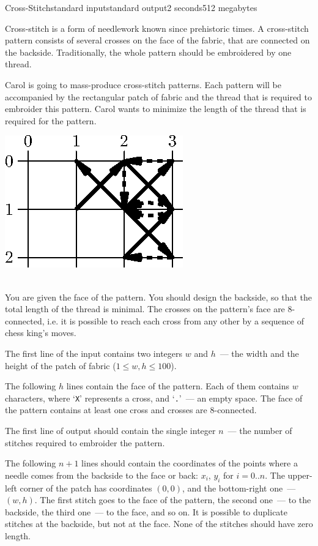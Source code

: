 \begin{problem}{Cross-Stitch}{standard input}{standard output}{2 seconds}{512 megabytes}

Cross-stitch is a form of needlework known since prehistoric times. A cross-stitch pattern consists of several crosses on the face of the fabric, that are connected on the backside. Traditionally, the whole pattern should be embroidered by one thread.

Carol is going to mass-produce cross-stitch patterns. Each pattern will be accompanied by the rectangular patch of fabric and the thread that is required to embroider this pattern. Carol wants to minimize the length of the thread that is required for the pattern.\\
\centerline{\includegraphics{cross-stitch-1.ps}}\\
You are given the face of the pattern. You should design the backside, so that the total length of the thread is minimal. The crosses on the pattern's face are 8-connected, i.e. it is possible to reach each cross from any other by a sequence of chess king's moves.

\InputFile
The first line of the input contains two integers $w$ and $h$~--- the width and the height of the patch of fabric ($1 \le w, h \le 100$).

The following $h$ lines contain the face of the pattern. Each of them contains $w$ characters, where `\texttt{X}' represents a cross, and `\texttt{.}'~--- an empty space. The face of the pattern contains at least one cross and crosses are 8-connected.

\OutputFile
The first line of output should contain the single integer $n$~--- the number of stitches required to embroider the pattern. 

The following $n + 1$ lines should contain the coordinates of the points where a needle comes from the backside to the face or back: $x_i$, $y_i$ for $i=0..n$. The upper-left corner of the patch has coordinates $(0, 0)$, and the bottom-right one~--- $(w, h)$. The first stitch goes to the face of the pattern, the second one~--- to the backside, the third one~--- to the face, and so on. It is possible to duplicate stitches at the backside, but not at the face. None of the stitches should have zero length.

\Example

\begin{example}
%
\end{example}

\end{problem}

